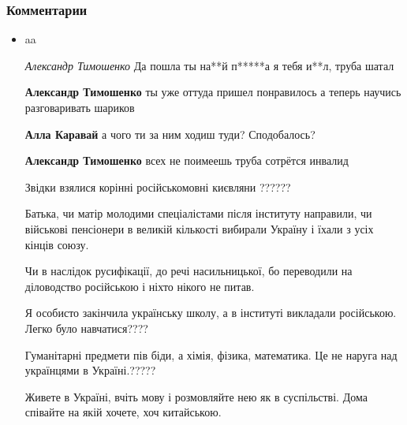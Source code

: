  
 
 
 
 
\clearpage
\subsubsection{Комментарии}
\label{sec:18_06_2020.fb.zharkih_ekaterina.1.mova_jazyk.cmt}

\begin{itemize}
\item aa

\emph{Александр Тимошенко}
Да пошла ты на**й п*****а я тебя и**л, труба шатал

\begin{itemize}
\textbf{Александр Тимошенко} ты уже оттуда пришел понравилось а теперь научись разговаривать шариков

\textbf{Алла Каравай} а чого ти за ним ходиш туди? Сподобалось?

\textbf{Александр Тимошенко} всех не поимеешь труба сотрётся инвалид
\end{itemize}


Звідки взялися корінні російськомовні києвляни ??????

Батька, чи матір молодими спеціалістами після інституту направили, чи військові
пенсіонери в великій кількості вибирали Україну і їхали з усіх кінців союзу.

Чи в наслідок русифікації, до речі насильницької, бо переводили на діловодство російською і ніхто нікого не питав.

Я особисто закінчила українську школу, а в інституті викладали російською.
Легко було навчатися????

Гуманітарні предмети пів біди, а хімія, фізика, математика. Це не наруга над українцями в Україні.?????

Живете в Україні, вчіть мову і розмовляйте нею як в суспільстві. Дома співайте
на якій хочете, хоч китайською.


\end{itemize}
